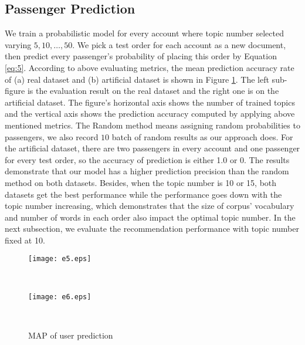 \documentclass{llncs}
\begin{document}
\subsection{Passenger Prediction}
\label{sub:pred}
We train a probabilistic model for every account where topic number selected varying ${5,10,\dots,50}$. We pick a test order for each account as a new document, then predict every passenger's probability of placing this order by Equation \ref{eq:5}. According to above evaluating metrics, the mean prediction accuracy rate of (a) real dataset and (b) artificial dataset is shown in Figure \ref{fig:pred}. The left sub-figure is the evaluation result on the real dataset and the right one is on the artificial dataset. The figure's horizontal axis shows the number of trained topics and the vertical axis shows the prediction accuracy computed by applying above mentioned metrics. The Random method means assigning random probabilities to passengers, we also record $10$ batch of random results as our approach does. For the artificial dataset, there are two passengers in every account and one passenger for every test order, so the accuracy of prediction is either 1.0 or 0. The results demonstrate that our model has a higher prediction precision than the random method on both datasets. Besides, when the topic number is 10 or 15, both datasets get the best performance while the performance goes down with the topic number increasing, which demonstrates that the size of corpus' vocabulary and number of words in each order also impact the optimal topic number. In the next subsection, we evaluate the recommendation performance with topic number fixed at 10.\par 

\begin{figure}[!h]
              \begin{minipage}[t]{0.47\linewidth}
              \centering
              \texttt{[image: e5.eps]}\\
              \end{minipage}
              \begin{minipage}[t]{0.005\linewidth}~~~
              \end{minipage}
              \begin{minipage}[t]{0.47\linewidth}
              \centering
              \texttt{[image: e6.eps]}\\
              \end{minipage}
              \begin{minipage}[t]{0.005\linewidth}~~~
              \end{minipage}
              \caption{MAP of user prediction}
          \label{fig:pred}
\end{figure}
\end{document}
